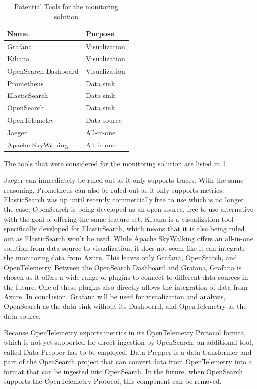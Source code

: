 \begin{table}[]
\begin{tabular}{l|l}
Name 					& Purpose 			\\
\hline
Grafana 				& Visualization		\\
Kibana 					& Visualization		\\
OpenSearch Dashboard 	& Visualization		\\
Prometheus 				& Data sink			\\
ElasticSearch 			& Data sink			\\
OpenSearch 				& Data sink			\\
OpenTelemetry 			& Data source		\\
Jaeger 					& All-in-one		\\
Apache SkyWalking 		& All-in-one
\end{tabular}
\caption{Potential Tools for the monitoring solution}
\label{tab:potential_tools}
\end{table}

The tools that were considered for the monitoring solution are listed in \ref{tab:potential_tools}.

Jaeger can immediately be ruled out as it only supports traces.
With the same reasoning, Prometheus can also be ruled out as it only supports metrics.
ElasticSearch was up until recently commercially free to use which is no longer the case.
OpenSearch is being developed as an open-source, free-to-use alternative with the goal
of offering the same feature set. Kibana is a visualization tool specifically developed for
ElasticSearch, which means that it is also being ruled out as ElasticSearch won't be used.
While Apache SkyWalking offers an all-in-one solution from data source to visualization,
it does not seem like it can integrate the monitoring data from Azure.
This leaves only Grafana, OpenSearch, and OpenTelemetry.
Between the OpenSearch Dashboard and Grafana, Grafana is chosen as it offers a wide range
of plugins to connect to different data sources in the future. One of these plugins also
directly allows the integration of data from Azure.
In conclusion, Grafana will be used for visualization and analysis, OpenSearch as the data sink without its Dashboard,
and OpenTelemetry as the data source.

Because OpenTelemetry exports metrics in its OpenTelemetry Protocol format,
which is not yet supported for direct ingestion by OpenSearch,
an additional tool, called Data Prepper has to be employed.
Data Prepper is a data transformer and part of the OpenSearch project that can convert
data from OpenTelemetry into a format that can be ingested into OpenSearch.
In the future, when OpenSearch supports the OpenTelemetry Protocol, this component can be removed.

